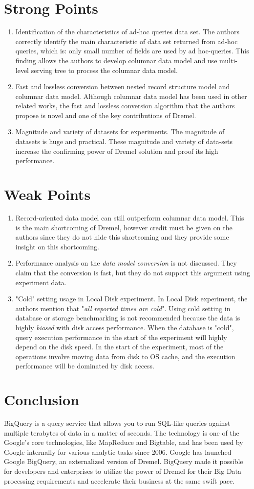 \documentclass[twocolumn]{article}
\newcommand{\be}{\begin{enumerate}}
\newcommand{\ee}{\end{enumerate}}
\newcommand{\ii}{\item}
\begin{document}
\section{Strong Points}
\be
\ii Identification of the characteristics of ad-hoc queries data set.
The authors correctly identify the main characteristic of data set returned from ad-hoc queries, which is: only small number of fields are used by ad hoc-queries. This finding allows the authors to develop columnar data model and use multi-level serving tree to process the columnar data model.
\ii Fast and lossless conversion between nested record structure model and columnar data model.
Although columnar data model has been used in other related works, the fast and lossless conversion algorithm that the authors propose is novel and one of the key contributions of Dremel.
\ii Magnitude and variety of datasets for experiments.
The magnitude of datasets is huge and practical. These magnitude and variety of data-sets increase the confirming power of Dremel solution and proof its high performance.
\ee
\section{Weak Points}
\be
\ii Record-oriented data model can still outperform columnar data model. This is the main shortcoming of Dremel, however credit must be given on the authors since they do not hide this shortcoming and they provide some insight on this shortcoming.
\ii Performance analysis on the \textit{data model conversion} is not discussed. They claim that the conversion is fast, but they do not support this argument using experiment data.
\ii "Cold" setting usage in Local Disk experiment. In Local Disk experiment, the authors mention that "\textit{all reported times are cold}". Using cold setting in database or storage benchmarking is not recommended because the data is highly \textit{biased} with disk access performance. When the database is "cold", query execution performance in the start of the experiment will highly depend on the disk speed. In the start of the experiment, most of the operations involve moving data from disk to OS cache, and the execution performance will be dominated by disk access.
\ee

\section{Conclusion}
BigQuery is a query service that allows you to run SQL-like queries against multiple terabytes of data in a matter of seconds. 
The technology is one of the Google’s core technologies, like MapReduce and Bigtable, and has been used by Google internally for various analytic tasks since 2006. Google has launched Google BigQuery, an externalized version of Dremel. BigQuery made it possible for developers and enterprises to utilize the power of Dremel for their Big Data processing requirements and accelerate their business at the same swift pace.
\end{document}
